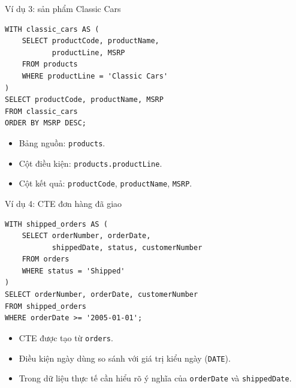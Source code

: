 \documentclass[aspectratio=169,10pt]{beamer}
\newcommand{\code}[1]{\texttt{#1}}
\begin{document}
\begin{frame}[fragile]{Ví dụ 3: sản phẩm Classic Cars}
\small
\begin{lstlisting}[basicstyle=\ttfamily\scriptsize]
WITH classic_cars AS (
    SELECT productCode, productName,
           productLine, MSRP
    FROM products
    WHERE productLine = 'Classic Cars'
)
SELECT productCode, productName, MSRP
FROM classic_cars
ORDER BY MSRP DESC;
\end{lstlisting}
\vspace{.1em}
\begin{itemize}
\item Bảng nguồn: \code{products}.
\item Cột điều kiện: \code{products.productLine}.
\item Cột kết quả: \code{productCode}, \code{productName}, \code{MSRP}.
\end{itemize}
\end{frame}

\begin{frame}[fragile]{Ví dụ 4: CTE đơn hàng đã giao}
\small
\begin{lstlisting}[basicstyle=\ttfamily\scriptsize]
WITH shipped_orders AS (
    SELECT orderNumber, orderDate,
           shippedDate, status, customerNumber
    FROM orders
    WHERE status = 'Shipped'
)
SELECT orderNumber, orderDate, customerNumber
FROM shipped_orders
WHERE orderDate >= '2005-01-01';
\end{lstlisting}
\vspace{.1em}
\begin{itemize}
\item CTE được tạo từ \code{orders}.
\item Điều kiện ngày dùng so sánh với giá trị kiểu ngày (\code{DATE}).
\item Trong dữ liệu thực tế cần hiểu rõ ý nghĩa của \code{orderDate} và \code{shippedDate}.
\end{itemize}
\end{frame}
\end{document}
